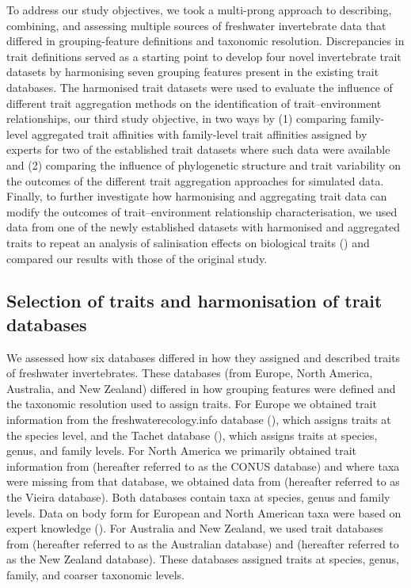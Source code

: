 \documentclass[12pt]{article}
\begin{document}
To address our study objectives, we took a multi-prong approach to describing, combining, and assessing multiple sources of freshwater invertebrate data that differed in grouping-feature definitions and taxonomic resolution. Discrepancies in trait definitions served as a starting point to develop four novel invertebrate trait datasets by harmonising seven grouping features present in the existing trait databases. The harmonised trait datasets were used to evaluate the influence of different trait aggregation methods on the identification of trait–environment relationships, our third study objective, in two ways by (1) comparing family-level aggregated trait affinities with family-level trait affinities assigned by experts for two of the established trait datasets where such data were available and (2) comparing the influence of phylogenetic structure and trait variability on the outcomes of the different trait aggregation approaches for simulated data. Finally, to further investigate how harmonising and aggregating trait data can modify the outcomes of trait–environment relationship characterisation, we used data from one of the newly established datasets with harmonised and aggregated traits to repeat an analysis of salinisation effects on biological traits (\cite{szocs_effects_2014}) and compared our results with those of the original study.

\subsection*{Selection of traits and harmonisation of trait databases}

We assessed how six databases differed in how they assigned and described traits of freshwater invertebrates. These databases (from Europe, North America, Australia, and New Zealand) differed in how grouping features were defined and the taxonomic resolution used to assign traits. For Europe we obtained trait information from the freshwaterecology.info database (\cite{schmidt-kloiber_www.freshwaterecology.info_2015}), which assigns traits at the species level, and the Tachet database (\cite{ussegliopolatera_biological_2000}), which assigns traits at species, genus, and family levels. For North America we primarily obtained trait information from \citet{twardochleb_freshwater_nodate} (hereafter referred to as the CONUS database) and where taxa were missing from that database, we obtained data from \citet{vieira_database_nodate} (hereafter referred to as the Vieira database). Both databases contain taxa at species, genus and family levels. Data on body form for European and North American taxa were based on expert knowledge (\cite{polatera_personal_information_2020}). For Australia and New Zealand, we used trait databases from \citet{kefford_integrated_2020} (hereafter referred to as the Australian database) and \citet{Philips_and_Smith_NZ_DB_2018} (hereafter referred to as the New Zealand database). These databases assigned traits at species, genus, family, and coarser taxonomic levels.
\end{document}
